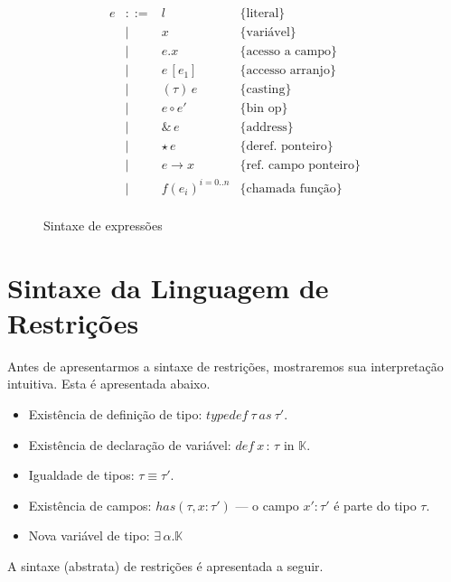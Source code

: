 \documentclass[a4paper,8pt]{article}
\begin{document}
    \begin{figure}[h]
       \[
         \begin{array}{lcll}
           e & ::= & l & \{\text{literal}\} \\
             & \mid & x & \{\text{variável}\} \\
             & \mid & e . x & \{\text{acesso a campo}\}\\
             & \mid & e\,[e_1] & \{\text{accesso arranjo}\} \\
             & \mid & (\tau)\,e & \{\text{casting}\} \\
             &\mid & e\circ e' & \{\text{bin op}\} \\
             & \mid & \&\,e & \{\text{address}\} \\
             & \mid & \star\,e & \{\text{deref. ponteiro}\}\\
             & \mid & e \to x & \{\text{ref. campo ponteiro}\}\\
             & \mid & f(e_i)^{i=0..n} & \{\text{chamada função}\}\\
         \end{array} \]
         \centering
         \caption{Sintaxe de expressões}
         \label{exprsyn}
    \end{figure}

     \section{Sintaxe da Linguagem de Restrições}\label{constraintsyn}

     Antes de apresentarmos a sintaxe de restrições, mostraremos sua
     interpretação intuitiva. Esta é apresentada abaixo.

       \begin{itemize}
           \item Existência de definição de tipo: $typedef\:\tau\:as\:\tau'$.
           \item Existência de declaração de variável:
             $def\:x\,:\,\tau \text{ in } \mathbb{K}$.
           \item Igualdade de tipos: $\tau \equiv \tau'$.
	   \item Existência de campos: $has(\tau,x:\tau')$ --- o campo $x'
             : \tau'$ é parte do tipo $\tau$.
           \item Nova variável de tipo: $\exists \,\alpha. \mathbb{K}$
       \end{itemize}

     A sintaxe (abstrata) de restrições é apresentada a seguir. 
\end{document}
